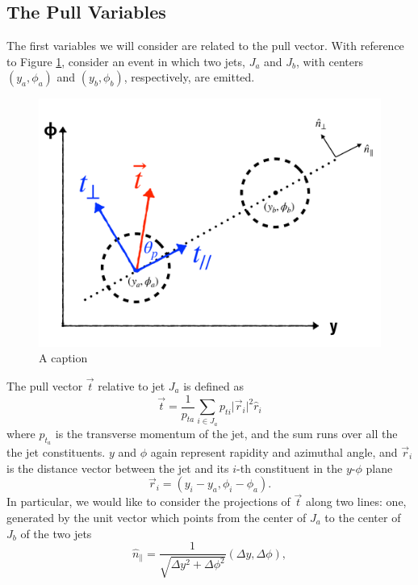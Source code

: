 \documentclass[10pt,a4paper]{book}
\begin{document}
\subsection{The Pull Variables}
The first variables we will consider are related to the pull vector. With reference to Figure \ref{Pull vector}, consider an event in which two jets, $J_a$ and $J_b$, with centers $(y_a, \phi_a)$ and $(y_b, \phi_b)$, respectively, are emitted.
\begin{figure}
\centering
\includegraphics[scale=0.3]{ch4_images/pull_components}
\caption{A caption}
\label{Pull vector}
\end{figure}
The pull vector $\vec{t}$ relative to jet $J_a$ is defined as
\begin{equation}
\vec{t} = \frac{1}{p_{ta}} \sum_{i \in J_a}p_{ti}\vert \vec{r}_i \vert^2 \hat{r}_i
\end{equation}
where $p_{t_a}$ is the transverse momentum of the jet, and the sum runs over all the the jet constituents. $y$ and $\phi$ again represent rapidity and azimuthal angle, and $\vec{r}_i$ is the distance vector between the jet and its $i$-th constituent in the $y$-$\phi$ plane
\begin{equation}
\vec{r}_i = (y_i - y_a, \phi_i - \phi_a).
\end{equation}
In particular, we would like to consider the projections of $\vec{t}$ along two lines: one, generated by the unit vector which points from the center of $J_a$ to the center of $J_b$ of the two jets
\begin{equation}
\hat{n}_\parallel = \frac{1}{\sqrt{\Delta y^2 + \Delta \phi^2}}\left(\Delta y, \Delta \phi \right),
\end{equation}
\end{document}
